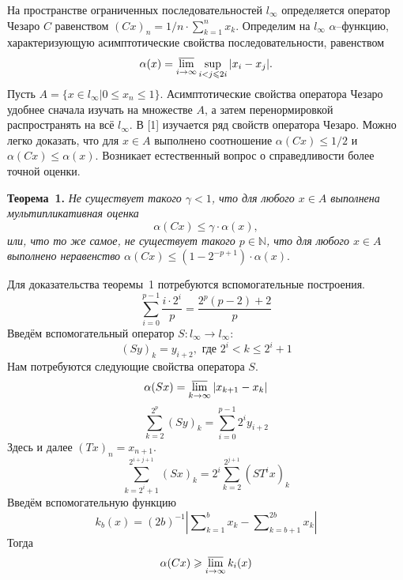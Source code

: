 \documentclass[10pt,pdf,hyperref={unicode}]{beamer}
\begin{document}
\begin{frame}
\end{frame}

На пространстве ограниченных последовательностей $l_\infty$ определяется оператор Чезаро $C$
равенством
$
	(Cx)_n = {1}/{n} \cdot \sum_{k=1}^n x_k.
$
Определим на $l_\infty$ $\alpha$--функцию,
характеризующую асимптотические свойства последовательности,
равенством
$$
	\alpha(x) = \varlimsup_{i\to\infty}\sup_{i < j \leqslant 2i} |x_i - x_j|.
$$
Пусть $A = \{x\in l_\infty | 0 \leqslant x_n \leqslant 1\}$.
Асимптотические свойства оператора Чезаро удобнее сначала изучать на множестве $A$,
а затем перенормировкой распространять на всё $l_\infty$.
В [1] изучается ряд свойств оператора Чезаро.
Можно легко доказать, что для $x\in A$ выполнено соотношение $\alpha(Cx) \leqslant 1/2$
и $\alpha(Cx) \leqslant \alpha(x)$.
Возникает естественный вопрос о справедливости более точной оценки.

\textbf{Теорема~1.}
{\it
	Не существует такого $\gamma < 1$,
	что для любого $x\in A$ выполнена мультипликативная оценка
	$$
		\alpha(Cx) \leqslant \gamma \cdot \alpha(x)
	,
	$$
или, что то же самое, не существует такого $p\in \mathbb{N}$,
	что для любого $x\in A$ выполнено неравенство
	$
		\alpha(Cx) \leqslant (1-2^{-p+1})\cdot \alpha(x).
	$
}

Для доказательства теоремы~1 потребуются вспомогательные построения.
\begin{equation}\label{summa_drobey}
	\sum_{i=0}^{p-1} \frac{i \cdot 2^i}{p} = \frac{2^p(p-2) + 2}{p}
\end{equation}
Введём вспомогательный оператор $S:l_\infty \to l_\infty$:
\begin{equation*}\label{operator_S}
	(Sy)_k = y_{i+2}, \mbox{ где } 2^i < k \leqslant 2^i+1
\end{equation*}
Нам потребуются следующие свойства оператора $S$.
\begin{equation}\label{alpha_S}
	\alpha(Sx) = \varlimsup_{k\to\infty} |x_{k+1} - x_{k}|
\end{equation}
\begin{equation}\label{summa_S_less}
	\sum_{k=2}^{2^p} (Sy)_k =
	\sum_{i=0}^{p-1} 2^i y_{i+2}
\end{equation}
Здесь и далее $(Tx)_n = x_{n+1}$.
\begin{equation}\label{summa_S}
	\sum_{k=2^i+1}^{2^{i+j+1}} (Sx)_k =
	2^i\sum_{k=2}^{2^{j+1}} (ST^ix)_k
\end{equation}
Введём вспомогательную функцию
\begin{equation*}\label{def_k_b}
	k_b(x) = (2b)^{-1} \left|
		\sum\nolimits_{k=1}^{b}x_k - \sum\nolimits_{k=b+1}^{2b}x_k
	\right|
\end{equation*}
Тогда
\begin{equation}\label{alpha_greater_k_b}
	\alpha (Cx) \geqslant \varlimsup_{i\to \infty} k_i(x)
\end{equation}
\end{document}
